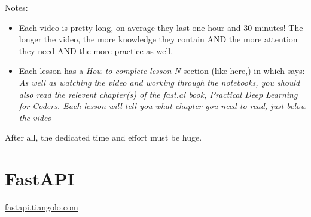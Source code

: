 			
			
			\noindent Notes:
			\begin{itemize}
				\item Each video is pretty long, on average they last one hour and 30 minutes! The longer the video, the more knowledge they contain AND the more attention they need AND the more practice as well.
				
				\item Each lesson has a \textit{How to complete lesson N} section (like \href{https://course.fast.ai/Lessons/lesson1.html#how-to-complete-lesson-1}{here},) in which says: \textit{As well as watching the video and working through the notebooks, you should also read the relevent chapter(s) of the fast.ai book, Practical Deep Learning for Coders. Each lesson will tell you what chapter you need to read, just below the video}
			\end{itemize}
		
		    After all, \textsf{the dedicated time and effort must be huge.}
		
		\clearpage
		\section{FastAPI}
			\epigraph{
				\begin{sansserif}
				\end{sansserif}	
			}{\href{https://fastapi.tiangolo.com}{fastapi.tiangolo.com}}
			
			\begin{inparadesc}
				\item \easy
		    	\item \shortvideo
		    	\item \many
			\end{inparadesc}
			\vspace{3mm}
			
			
